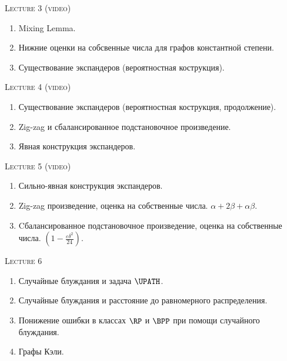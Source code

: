 \centerline{\textsc{Lecture 3 (video)}}

\begin{enumerate}
    \item Mixing Lemma.
    \item Нижние оценки на собсвенные числа для графов константной степени.
    \item Существование экспандеров (вероятностная кострукция).
\end{enumerate}

\centerline{\textsc{Lecture 4 (video)}}

\begin{enumerate}
    \item Существование экспандеров (вероятностная кострукция, продолжение).
    \item Zig-zag и сбалансированное подстановочное произведение.
    \item Явная конструкция экспандеров.
\end{enumerate}

\centerline{\textsc{Lecture 5 (video)}}

\begin{enumerate}
    \item Сильно-явная конструкция экспандеров.
    \item Zig-zag произведение, оценка на собственные числа. $\alpha + 2 \beta + \alpha \beta$.
    \item Cбалансированное подстановочное произведение, оценка на собственные числа. $\left(1 -
        \frac{\varepsilon \delta^2}{24}\right)$.
\end{enumerate}


\centerline{\textsc{Lecture 6}}

\begin{enumerate}
    \item Случайные блуждания и задача $\UPATH$.
    \item Случайные блуждания и расстояние до равномерного распределения.
    \item Понижение ошибки в классах $\RP$ и $\BPP$ при помощи случайного блуждания.
    \item Графы Кэли.
\end{enumerate}
